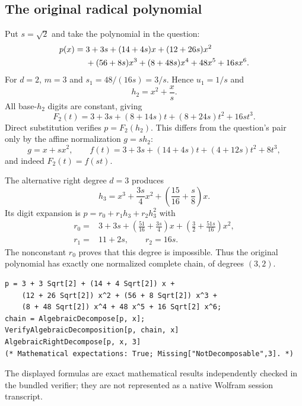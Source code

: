 \documentclass[11pt,a4paper]{article}
\numberwithin{equation}{section}
\theoremstyle{definition}
\theoremstyle{remark}
\begin{document}
\subsection{The original radical polynomial}
Put $s=\sqrt2$ and take the polynomial in the question:
\begin{align}
 p(x)={}&3+3s+(14+4s)x+(12+26s)x^2\notag\\
        &+(56+8s)x^3+(8+48s)x^4+48x^5+16s x^6.
 \label{eq:original}
\end{align}
For $d=2$, $m=3$ and $s_1=48/(16s)=3/s$. Hence $u_1=1/s$ and
\begin{equation}
 h_2=x^2+\frac{x}{s}.
 \label{eq:originalh}
\end{equation}
All base-$h_2$ digits are constant, giving
\begin{equation}
 F_2(t)=3+3s+(8+14s)t+(8+24s)t^2+16s t^3.
 \label{eq:originalF}
\end{equation}
Direct substitution verifies $p=F_2(h_2)$. This differs from the question's
pair only by the affine normalization $g=s h_2$:
\[
 g=x+s x^2,\qquad
 f(t)=3+3s+(14+4s)t+(4+12s)t^2+8t^3,
\]
and indeed $F_2(t)=f(st)$.

The alternative right degree $d=3$ produces
\[
 h_3=x^3+\frac{3s}{4}x^2+\left(\frac{15}{16}+\frac{s}{8}\right)x.
\]
Its digit expansion is $p=r_0+r_1h_3+r_2h_3^2$ with
\begin{align*}
 r_0={}&3+3s+\left(\frac{51}{16}+\frac{3s}{4}\right)x
                +\left(\frac32+\frac{51s}{16}\right)x^2,\\
 r_1={}&11+2s,\qquad r_2=16s.
\end{align*}
The nonconstant $r_0$ proves that this degree is impossible. Thus the original
polynomial has exactly one normalized complete chain, of degrees $(3,2)$.

\begin{lstlisting}
p = 3 + 3 Sqrt[2] + (14 + 4 Sqrt[2]) x +
    (12 + 26 Sqrt[2]) x^2 + (56 + 8 Sqrt[2]) x^3 +
    (8 + 48 Sqrt[2]) x^4 + 48 x^5 + 16 Sqrt[2] x^6;
chain = AlgebraicDecompose[p, x];
VerifyAlgebraicDecomposition[p, chain, x]
AlgebraicRightDecompose[p, x, 3]
(* Mathematical expectations: True; Missing["NotDecomposable",3]. *)
\end{lstlisting}
The displayed formulas are exact mathematical results independently checked
in the bundled verifier; they are not represented as a native Wolfram session
transcript.
\end{document}
